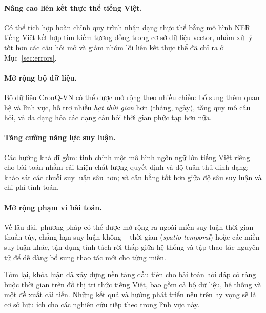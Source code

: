 \paragraph{Nâng cao liên kết thực thể tiếng Việt.} Có thể tích hợp hoàn chỉnh quy trình nhận dạng
thực thể bằng mô hình NER tiếng Việt kết hợp tìm kiếm tương đồng trong cơ sở dữ liệu vector, nhằm
xử lý tốt hơn các câu hỏi mở và giảm nhóm lỗi liên kết thực thể đã chỉ ra ở Mục~\ref{sec:errors}.

\paragraph{Mở rộng bộ dữ liệu.} Bộ dữ liệu CronQ-VN có thể được mở rộng theo nhiều chiều: bổ sung
thêm quan hệ và lĩnh vực, hỗ trợ nhiều \emph{hạt thời gian} hơn (tháng, ngày), tăng quy mô câu hỏi,
và đa dạng hóa các dạng câu hỏi thời gian phức tạp hơn nữa.

\paragraph{Tăng cường năng lực suy luận.} Các hướng khả dĩ gồm: tinh chỉnh một mô hình ngôn ngữ lớn
tiếng Việt riêng cho bài toán nhằm cải thiện chất lượng quyết định và độ tuân thủ định dạng; khảo
sát các chuỗi suy luận sâu hơn; và cân bằng tốt hơn giữa độ sâu suy luận và chi phí tính toán.

\paragraph{Mở rộng phạm vi bài toán.} Về lâu dài, phương pháp có thể được mở rộng ra ngoài miền suy
luận thời gian thuần túy, chẳng hạn suy luận không -- thời gian (\textit{spatio-temporal}) hoặc các
miền suy luận khác, tận dụng tính tách rời thấp giữa hệ thống và tập thao tác nguyên tử để dễ dàng
bổ sung thao tác mới cho từng miền.

\bigskip

Tóm lại, khóa luận đã xây dựng nền tảng đầu tiên cho bài toán hỏi đáp có ràng buộc thời gian trên đồ
thị tri thức tiếng Việt, bao gồm cả bộ dữ liệu, hệ thống và một đề xuất cải tiến. Những kết quả và
hướng phát triển nêu trên hy vọng sẽ là cơ sở hữu ích cho các nghiên cứu tiếp theo trong lĩnh vực
này.
